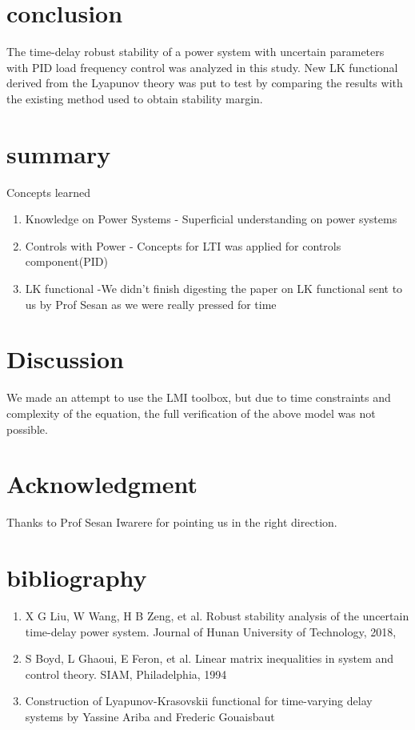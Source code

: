 \documentclass[journal]{IEEEtran}
\begin{document}
\section{conclusion}
The time-delay robust stability of a power system with uncertain parameters with PID load frequency control was analyzed in this study. New LK functional derived from the Lyapunov theory was put to test by comparing the results with the existing method used to obtain stability margin. 
\section{summary}
Concepts learned
\begin{enumerate}
  \item Knowledge on Power Systems - Superficial understanding on power systems
  \item Controls with Power - Concepts for LTI was applied for controls component(PID)
  \item LK functional -We didn't finish digesting the paper on LK functional sent to us by Prof Sesan as we were really pressed for time
\end{enumerate}
\section{Discussion}
We made an attempt to use the LMI toolbox, but due to time constraints and complexity of the equation,  the full verification of the above model was not possible.
\appendices
\section*{Acknowledgment}
Thanks to Prof Sesan Iwarere for pointing us in the right direction.
\section{bibliography}
 \begin{enumerate} 
    \item X G Liu, W Wang, H B Zeng, et al. Robust stability analysis of the uncertain time-delay power system. Journal of Hunan University of Technology, 2018,  
    \item S Boyd, L Ghaoui, E Feron, et al. Linear matrix inequalities in system and control theory. SIAM, Philadelphia, 1994 
    \item Construction of Lyapunov-Krasovskii functional for time-varying delay systems by Yassine Ariba and Frederic Gouaisbaut
 \end{enumerate}
\end{document}
